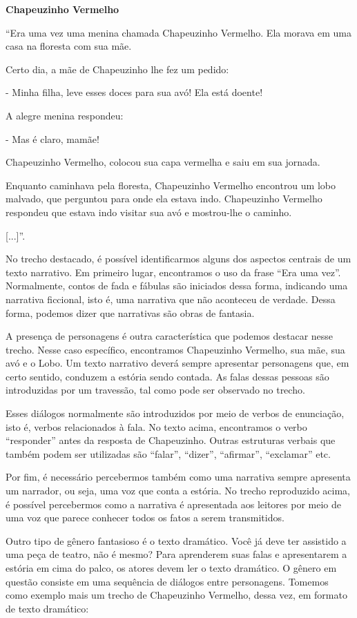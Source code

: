 \textbf{Chapeuzinho Vermelho}

``Era uma vez uma menina chamada Chapeuzinho Vermelho. Ela morava em uma
casa na floresta com sua mãe.

Certo dia, a mãe de Chapeuzinho lhe fez um pedido:

- Minha filha, leve esses doces para sua avó! Ela está doente!

A alegre menina respondeu:

- Mas é claro, mamãe!

Chapeuzinho Vermelho, colocou sua capa vermelha e saiu em sua jornada.

Enquanto caminhava pela floresta, Chapeuzinho Vermelho encontrou um lobo
malvado, que perguntou para onde ela estava indo. Chapeuzinho Vermelho
respondeu que estava indo visitar sua avó e mostrou-lhe o caminho.

{[}...{]}''.

No trecho destacado, é possível identificarmos alguns dos aspectos
centrais de um texto narrativo. Em primeiro lugar, encontramos o uso da
frase ``Era uma vez''. Normalmente, contos de fada e fábulas são
iniciados dessa forma, indicando uma narrativa ficcional, isto é, uma
narrativa que não aconteceu de verdade. Dessa forma, podemos dizer que
narrativas são obras de fantasia.

A presença de personagens é outra característica que podemos destacar
nesse trecho. Nesse caso específico, encontramos Chapeuzinho Vermelho,
sua mãe, sua avó e o Lobo. Um texto narrativo deverá sempre apresentar
personagens que, em certo sentido, conduzem a estória sendo contada. As
falas dessas pessoas são introduzidas por um travessão, tal como pode
ser observado no trecho.

Esses diálogos normalmente são introduzidos por meio de verbos de
enunciação, isto é, verbos relacionados à fala. No texto acima,
encontramos o verbo ``responder'' antes da resposta de Chapeuzinho.
Outras estruturas verbais que também podem ser utilizadas são ``falar'',
``dizer'', ``afirmar'', ``exclamar'' etc.

Por fim, é necessário percebermos também como uma narrativa sempre
apresenta um narrador, ou seja, uma voz que conta a estória. No trecho
reproduzido acima, é possível percebermos como a narrativa é apresentada
aos leitores por meio de uma voz que parece conhecer todos os fatos a
serem transmitidos.

Outro tipo de gênero fantasioso é o texto dramático. Você já deve ter
assistido a uma peça de teatro, não é mesmo? Para aprenderem suas falas
e apresentarem a estória em cima do palco, os atores devem ler o texto
dramático. O gênero em questão consiste em uma sequência de diálogos
entre personagens. Tomemos como exemplo mais um trecho de Chapeuzinho
Vermelho, dessa vez, em formato de texto dramático:

